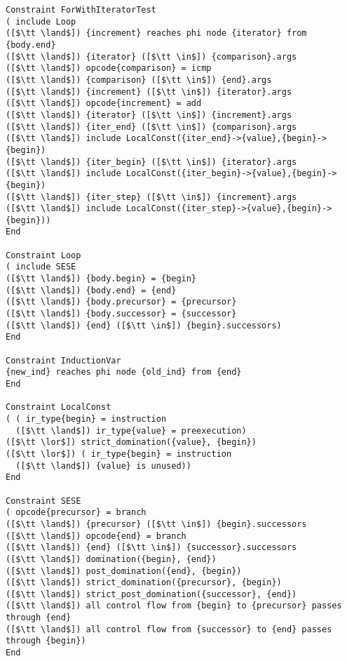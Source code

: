 \begin{lstlisting}[language=CAnDL]
Constraint ForWithIteratorTest
( include Loop
([$\tt \land$]) {increment} reaches phi node {iterator} from {body.end}
([$\tt \land$]) {iterator} ([$\tt \in$]) {comparison}.args
([$\tt \land$]) opcode{comparison} = icmp
([$\tt \land$]) {comparison} ([$\tt \in$]) {end}.args
([$\tt \land$]) {increment} ([$\tt \in$]) {iterator}.args
([$\tt \land$]) opcode{increment} = add
([$\tt \land$]) {iterator} ([$\tt \in$]) {increment}.args
([$\tt \land$]) {iter_end} ([$\tt \in$]) {comparison}.args
([$\tt \land$]) include LocalConst({iter_end}->{value},{begin}->{begin})
([$\tt \land$]) {iter_begin} ([$\tt \in$]) {iterator}.args
([$\tt \land$]) include LocalConst({iter_begin}->{value},{begin}->{begin})
([$\tt \land$]) {iter_step} ([$\tt \in$]) {increment}.args
([$\tt \land$]) include LocalConst({iter_step}->{value},{begin}->{begin}))
End

Constraint Loop
( include SESE
([$\tt \land$]) {body.begin} = {begin}
([$\tt \land$]) {body.end} = {end}
([$\tt \land$]) {body.precursor} = {precursor}
([$\tt \land$]) {body.successor} = {successor}
([$\tt \land$]) {end} ([$\tt \in$]) {begin}.successors)
End

Constraint InductionVar
{new_ind} reaches phi node {old_ind} from {end}
End

Constraint LocalConst
( ( ir_type{begin} = instruction
  ([$\tt \land$]) ir_type{value} = preexecution)
([$\tt \lor$]) strict_domination({value}, {begin})
([$\tt \lor$]) ( ir_type{begin} = instruction
  ([$\tt \land$]) {value} is unused))
End

Constraint SESE
( opcode{precursor} = branch
([$\tt \land$]) {precursor} ([$\tt \in$]) {begin}.successors
([$\tt \land$]) opcode{end} = branch
([$\tt \land$]) {end} ([$\tt \in$]) {successor}.successors
([$\tt \land$]) domination({begin}, {end})
([$\tt \land$]) post_domination({end}, {begin})
([$\tt \land$]) strict_domination({precursor}, {begin})
([$\tt \land$]) strict_post_domination({successor}, {end})
([$\tt \land$]) all control flow from {begin} to {precursor} passes through {end}
([$\tt \land$]) all control flow from {successor} to {end} passes through {begin})
End
\end{lstlisting}
